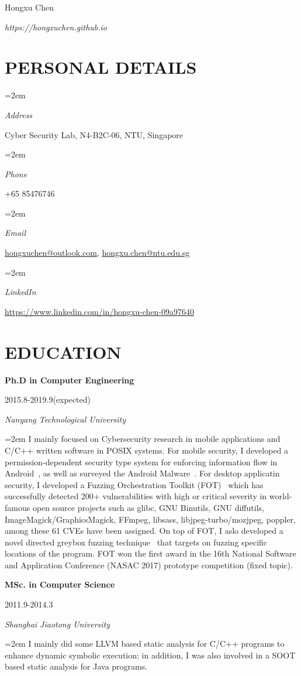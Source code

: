 \documentclass[paper=a4,fontsize=11pt]{article} %
\newlength{\spacebox}
\newcommand{\sepspace}{\vspace*{9pt}}		%
\newcommand{\MyName}[1]{ %
		\Huge \usefont{OT1}{phv}{b}{n} \hfill #1
		\par \normalsize \normalfont}
\newcommand{\MySlogan}[1]{ %
		\large \usefont{OT1}{phv}{m}{n}\hfill \textit{#1}
		\par \normalsize \normalfont}
\newcommand{\NewPart}[1]{\section*{\uppercase{#1}}}
\newcommand{\PersonalEntry}[2]{
		\noindent\hangindent=2em\hangafter=0 %
		\parbox{\spacebox}{        %
		\textit{#1}}		       %
		\hspace{1.5em} #2 \par}    %
\newcommand{\EducationEntry}[4]{
		\noindent \textbf{#1} \hfill      %
			\parbox{12em}{%
			\hfill\color{Black}#2} \par  %
		\noindent \textit{#3} \par        %
		\noindent\hangindent=2em\hangafter=0 \small #4 %
		\normalsize \par}
\begin{document}
\nocite{*}


\MyName{Hongxu Chen}
\MySlogan{{https://hongxuchen.github.io}}


\sepspace

\NewPart{Personal details}{}

\PersonalEntry{Address}{Cyber Security Lab, N4-B2C-06, NTU, Singapore}
\PersonalEntry{Phone}{+65 85476746}
\PersonalEntry{Email}{\url{hongxuchen@outlook.com}, \url{hongxu.chen@ntu.edu.sg}}
\PersonalEntry{LinkedIn}{\url{https://www.linkedin.com/in/hongxu-chen-09a97640}}

\NewPart{Education}{}

\EducationEntry{Ph.D in Computer Engineering}{2015.8-2019.9(expected)}{Nanyang Technological University}{
    I mainly focused on Cybersecurity research in mobile applications and C/C++ written software in POSIX systems. For mobile security, I developed a permission-dependent security type system for enforcing information flow in Android~\cite{sta}, as well as surveyed the Android Malware~\cite{XueM0TC0Z17}. For desktop applicatin security, I developed a Fuzzing Orchestration Toolkit (FOT)~\cite{fse18-fot} which has successfully detected 200+ vulnerabilities with high or critical severity in world-famous open source projects such as glibc, GNU Binutils, GNU diffutils, ImageMagick/GraphicsMagick, FFmpeg, libsass, libjpeg-turbo/mozjpeg, poppler, among these 61 CVEs have been assigned. On top of FOT, I aslo developed a novel directed greybox fuzzing technique~\cite{hawkeye} that targets on fuzzing specific locations of the program. FOT won the first award in the 16th National Software and Application Conference (NASAC 2017) prototype competition (fixed topic).
}
\sepspace

\EducationEntry{MSc. in Computer Science}{2011.9-2014.3}{Shanghai Jiaotong University}{
  I mainly did some LLVM based static analysis for C/C++ programs to enhance dynamic symbolic execution; in addition, I was also involved in a SOOT based static analysis for Java programs.}
\sepspace
\end{document}
